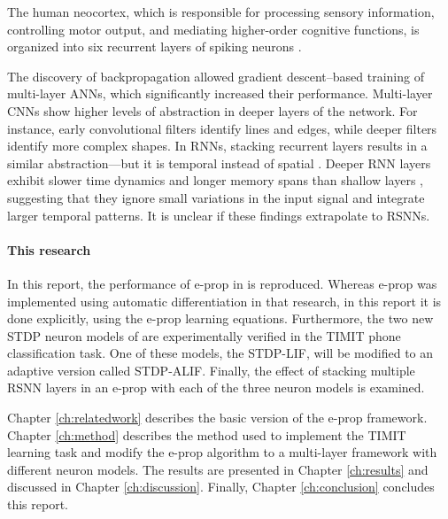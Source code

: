 The human neocortex, which is responsible for processing sensory information, controlling motor output, and mediating higher-order cognitive functions, is organized into six recurrent layers of spiking neurons \citep{greig2013molecular}.

The discovery of backpropagation allowed gradient descent--based training of multi-layer ANNs, which significantly increased their performance.
Multi-layer CNNs show higher levels of abstraction in deeper layers of the network.
For instance, early convolutional filters identify lines and edges, while deeper filters identify more complex shapes.
In RNNs, stacking recurrent layers results in a similar abstraction---but it is temporal instead of spatial \citep{hermans2013training,gallicchio2017deep}.
Deeper RNN layers exhibit slower time dynamics and longer memory spans than shallow layers \citep{gallicchio2018short}, suggesting that they ignore small variations in the input signal and integrate larger temporal patterns.
It is unclear if these findings extrapolate to RSNNs.

\paragraph{This research}
In this report, the performance of e-prop in \citet{bellec2020solution} is reproduced.
Whereas e-prop was implemented using automatic differentiation in that research, in this report it is done explicitly, using the e-prop learning equations.
Furthermore, the two new STDP neuron models of \citet{traub2020learning} are experimentally verified in the TIMIT phone classification task.
One of these models, the STDP-LIF, will be modified to an adaptive version called STDP-ALIF.
Finally, the effect of stacking multiple RSNN layers in an e-prop with each of the three neuron models is examined.

Chapter \ref{ch:relatedwork} describes the basic version of the e-prop framework.
Chapter \ref{ch:method} describes the method used to implement the TIMIT learning task and modify the e-prop algorithm to a multi-layer framework with different neuron models.
The results are presented in Chapter \ref{ch:results} and discussed in Chapter \ref{ch:discussion}.
Finally, Chapter \ref{ch:conclusion} concludes this report.
